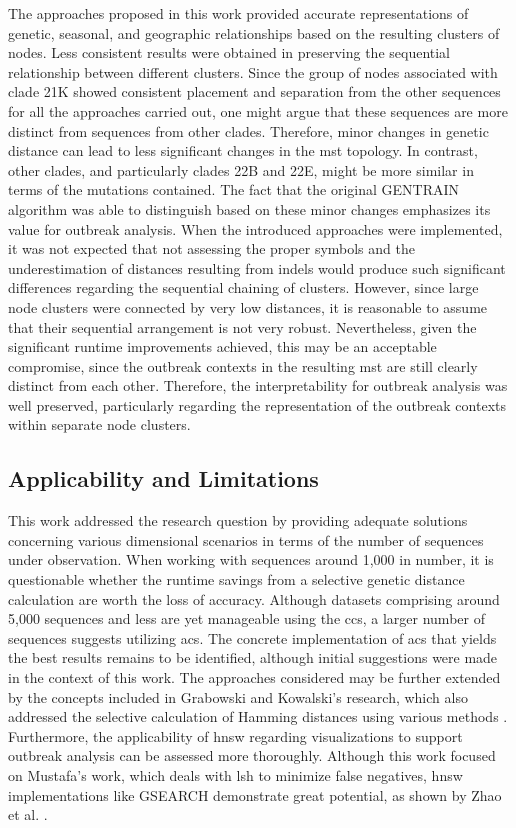 The approaches proposed in this work provided accurate representations of genetic, seasonal, and geographic relationships based on the resulting clusters of nodes. Less consistent results were obtained in preserving the sequential relationship between different clusters. Since the group of nodes associated with clade 21K showed consistent placement and separation from the other sequences for all the approaches carried out, one might argue that these sequences are more distinct from sequences from other clades. Therefore, minor changes in genetic distance can lead to less significant changes in the \acrshort{mst} topology. In contrast, other clades, and particularly clades 22B and 22E, might be more similar in terms of the mutations contained. The fact that the original GENTRAIN algorithm was able to distinguish based on these minor changes emphasizes its value for outbreak analysis. When the introduced approaches were implemented, it was not expected that not assessing the proper symbols and the underestimation of distances resulting from indels would produce such significant differences regarding the sequential chaining of clusters. However, since large node clusters were connected by very low distances, it is reasonable to assume that their sequential arrangement is not very robust. Nevertheless, given the significant runtime improvements achieved, this may be an acceptable compromise, since the outbreak contexts in the resulting \acrshort{mst} are still clearly distinct from each other. Therefore, the interpretability for outbreak analysis was well preserved, particularly regarding the representation of the outbreak contexts within separate node clusters.

\subsection{Applicability and Limitations}
This work addressed the research question by providing adequate solutions concerning various dimensional scenarios in terms of the number of sequences under observation. 
When working with sequences around 1,000 in number, it is questionable whether the runtime savings from a selective genetic distance calculation are worth the loss of accuracy. Although datasets comprising around 5,000 sequences and less are yet manageable using the \acrshort{ccs}, a larger number of sequences suggests utilizing \acrshort{acs}. The concrete implementation of \acrshort{acs} that yields the best results remains to be identified, although initial suggestions were made in the context of this work. The approaches considered may be further extended by the concepts included in Grabowski and Kowalski's research, which also addressed the selective calculation of Hamming distances using various methods \cite{Gra1}. Furthermore, the applicability of \acrshort{hnsw} regarding visualizations to support outbreak analysis can be assessed more thoroughly. Although this work focused on Mustafa's work, which deals with \acrshort{lsh} to minimize false negatives, \acrshort{hnsw} implementations like GSEARCH demonstrate great potential, as shown by Zhao et al. \cite{Zha1}.

